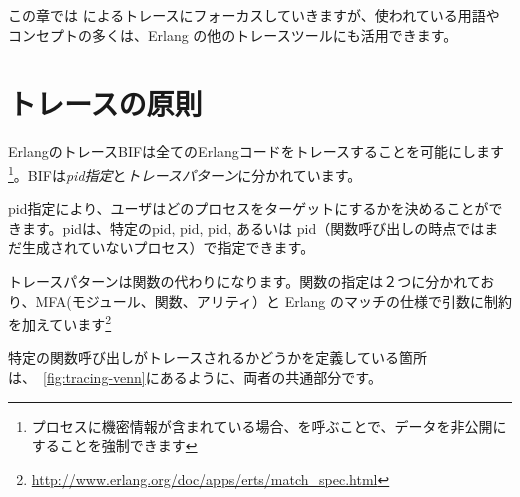 この章では  によるトレースにフォーカスしていきますが、使われている用語やコンセプトの多くは、Erlang の他のトレースツールにも活用できます。

\section{トレースの原則}
\label{sec:tracing-princples}

ErlangのトレースBIFは全てのErlangコードをトレースすることを可能にします\footnote{プロセスに機密情報が含まれている場合、を呼ぶことで、データを非公開にすることを強制できます}。BIFは\emph{pid指定}と\emph{トレースパターン}に分かれています。

pid指定により、ユーザはどのプロセスをターゲットにするかを決めることができます。pidは、特定のpid, pid, pid, あるいは  pid（関数呼び出しの時点ではまだ生成されていないプロセス）で指定できます。

トレースパターンは関数の代わりになります。関数の指定は２つに分かれており、MFA(モジュール、関数、アリティ）と Erlang のマッチの仕様で引数に制約を加えています\footnote{\href{http://www.erlang.org/doc/apps/erts/match\_spec.html}{http://www.erlang.org/doc/apps/erts/match\_spec.html}}

特定の関数呼び出しがトレースされるかどうかを定義している箇所は、~\ref{fig:tracing-venn}にあるように、両者の共通部分です。

